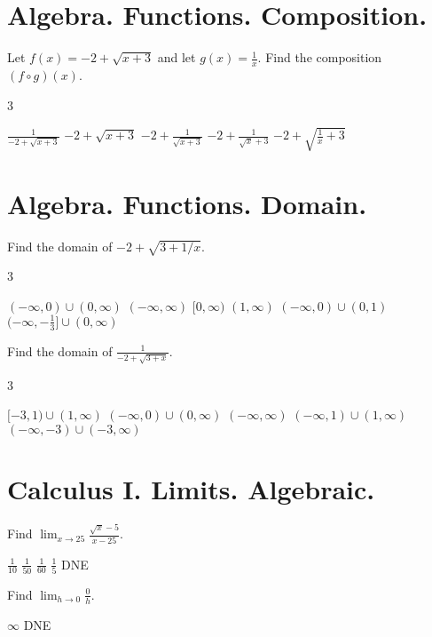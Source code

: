 \documentclass[addpoints]{exam}
\begin{document}
\begin{questions}

\section{Algebra. Functions. Composition.}
\question Let $f(x) = -2+\sqrt{x+3}$ and let $g(x) = \frac1x$. Find the composition $(f\circ g)(x)$.
\begin{multicols}3
\begin{choices}
	\choice $\frac1{-2+\sqrt{x+3}}$
	\choice $-2+\sqrt{x+3}$
	\choice $-2+\frac1{\sqrt{x+3}}$
	\choice $-2+\frac1{\sqrt x+3}$
	\correctchoice $-2+\sqrt{\frac1x+3}$
	\end{choices}
	\end{multicols}

\section{Algebra. Functions. Domain.}
\question Find the domain of $-2+\sqrt{3+1/x}$.
\begin{multicols}3
\begin{choices}
	\choice $(-\infty,0)\cup(0,\infty)$ %
	\choice $(-\infty,\infty)$ %
	\choice $[0,\infty)$ %
	\choice $(1,\infty)$ %
	\choice $(-\infty,0)\cup(0,1)$ %
	\correctchoice $(-\infty,-\tfrac13]\cup(0,\infty)$ %
	\end{choices}
	\end{multicols}
\question Find the domain of $\frac1{-2+\sqrt{3+x}}$.
\begin{multicols}3
\begin{choices}
	\correctchoice $[-3,1)\cup(1,\infty)$
	\choice $(-\infty,0)\cup(0,\infty)$
	\choice $(-\infty,\infty)$
	\choice $(-\infty,1)\cup(1,\infty)$
	\choice $(-\infty,-3)\cup(-3,\infty)$
	\end{choices}
	\end{multicols}

\section{Calculus I. Limits. Algebraic.}
\question Find $\lim_{x\to 25} \frac{\sqrt x-5}{x-25}$. \qquad\qquad
\begin{oneparchoices}
	\correctchoice $\frac1{10}$
	\choice $\frac1{50}$ %
	\choice $\frac1{60}$
	\choice $\frac15$
	\choice DNE
	\end{oneparchoices}
\question Find $\lim_{h\to0} \frac0h$. \qquad\qquad
\begin{oneparchoices}
	\choice $\infty$
	\choice DNE
	\end{oneparchoices}
\end{questions}
\end{document}
